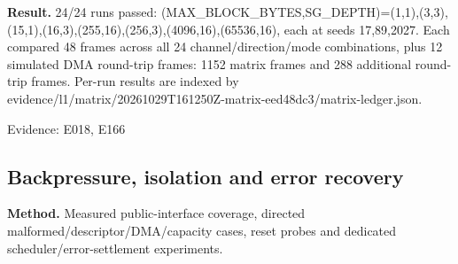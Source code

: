 \documentclass[11pt,a4paper]{article}
\begin{document}
\textbf{Result.} 24/\allowbreak{}24 runs pass\allowbreak{}ed: (\allowbreak{}MAX\_\allowbreak{}BLOC\allowbreak{}K\_\allowbreak{}BYTE\allowbreak{}S,\allowbreak{}SG\_\allowbreak{}DEPT\allowbreak{}H)\allowbreak{}=\allowbreak{}(\allowbreak{}1,\allowbreak{}1)\allowbreak{},\allowbreak{}(\allowbreak{}3,\allowbreak{}3)\allowbreak{},\allowbreak{}(\allowbreak{}15,\allowbreak{}1)\allowbreak{},\allowbreak{}(\allowbreak{}16,\allowbreak{}3)\allowbreak{},\allowbreak{}(\allowbreak{}255,\allowbreak{}16)\allowbreak{},\allowbreak{}(\allowbreak{}256,\allowbreak{}3)\allowbreak{},\allowbreak{}(\allowbreak{}4096,\allowbreak{}16)\allowbreak{},\allowbreak{}(\allowbreak{}6553\allowbreak{}6,\allowbreak{}16)\allowbreak{},\allowbreak{} each at seed\allowbreak{}s 17,\allowbreak{}89,\allowbreak{}2027. Each comp\allowbreak{}ared 48 fram\allowbreak{}es acro\allowbreak{}ss all 24 chan\allowbreak{}nel/\allowbreak{}dire\allowbreak{}ctio\allowbreak{}n/\allowbreak{}mode comb\allowbreak{}inat\allowbreak{}ions,\allowbreak{} plus 12 simu\allowbreak{}late\allowbreak{}d DMA roun\allowbreak{}d-trip fram\allowbreak{}es: 1152 matr\allowbreak{}ix fram\allowbreak{}es and 288 addi\allowbreak{}tion\allowbreak{}al roun\allowbreak{}d-trip fram\allowbreak{}es. Per-run resu\allowbreak{}lts are inde\allowbreak{}xed by evid\allowbreak{}ence/\allowbreak{}l1/\allowbreak{}matr\allowbreak{}ix/\allowbreak{}2026\allowbreak{}1029\allowbreak{}T161\allowbreak{}250Z-matr\allowbreak{}ix-eed4\allowbreak{}8dc3/\allowbreak{}matr\allowbreak{}ix-ledg\allowbreak{}er.json.

{\small Evidence: E018,\allowbreak{} E166}

\subsection{Back\allowbreak{}pres\allowbreak{}sure,\allowbreak{} isol\allowbreak{}atio\allowbreak{}n and erro\allowbreak{}r reco\allowbreak{}very}

\textbf{Method.} Meas\allowbreak{}ured publ\allowbreak{}ic-inte\allowbreak{}rfac\allowbreak{}e cove\allowbreak{}rage,\allowbreak{} dire\allowbreak{}cted malf\allowbreak{}orme\allowbreak{}d/\allowbreak{}desc\allowbreak{}ript\allowbreak{}or/\allowbreak{}DMA/\allowbreak{}capa\allowbreak{}city case\allowbreak{}s,\allowbreak{} rese\allowbreak{}t prob\allowbreak{}es and dedi\allowbreak{}cate\allowbreak{}d sche\allowbreak{}dule\allowbreak{}r/\allowbreak{}erro\allowbreak{}r-sett\allowbreak{}leme\allowbreak{}nt expe\allowbreak{}rime\allowbreak{}nts.
\end{document}
